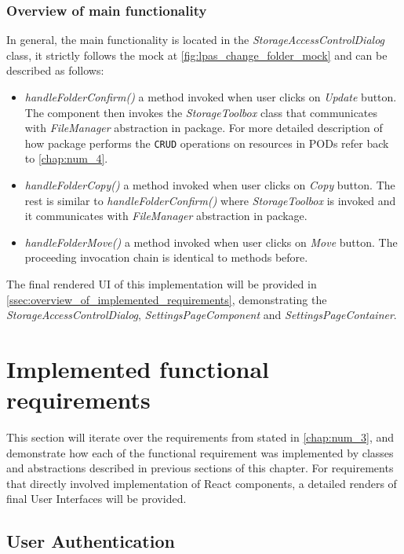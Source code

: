 \subsubsection{Overview of main functionality}

In general, the main functionality is located in the \textit{StorageAccessControlDialog} class, it strictly follows the mock at \autoref{fig:lpas_change_folder_mock} and can be described as follows:
\begin{itemize}
	\item \textit{handleFolderConfirm()} a method invoked when user clicks on \textit{Update} button. The component then invokes the \textit{StorageToolbox} class that communicates with \textit{FileManager} abstraction in \lpas{} package. For more detailed description of how \lpas{} package performs the \texttt{CRUD} operations on resources in \solid{} PODs refer back to \autoref{chap:num_4}.
	\item \textit{handleFolderCopy()} a method invoked when user clicks on \textit{Copy} button. The rest is similar to \textit{handleFolderConfirm()} where \textit{StorageToolbox} is invoked and it communicates with \textit{FileManager} abstraction in \lpas{} package. 
	\item \textit{handleFolderMove()} a method invoked when user clicks on \textit{Move} button. The proceeding invocation chain is identical to methods before.
\end{itemize}

The final rendered UI of this implementation will be provided in \autoref{ssec:overview_of_implemented_requirements}, demonstrating the \textit{StorageAccessControlDialog}, \textit{SettingsPageComponent} and \textit{SettingsPageContainer}.

\section{Implemented functional requirements}
\label{ssec:overview_of_implemented_requirements}

This section will iterate over the requirements from \lpa{} stated in \autoref{chap:num_3}, and demonstrate how each of the functional requirement was implemented by classes and abstractions described in previous sections of this chapter. For requirements that directly involved implementation of React components, a detailed renders of final User Interfaces will be provided. 

\subsection{User Authentication}

